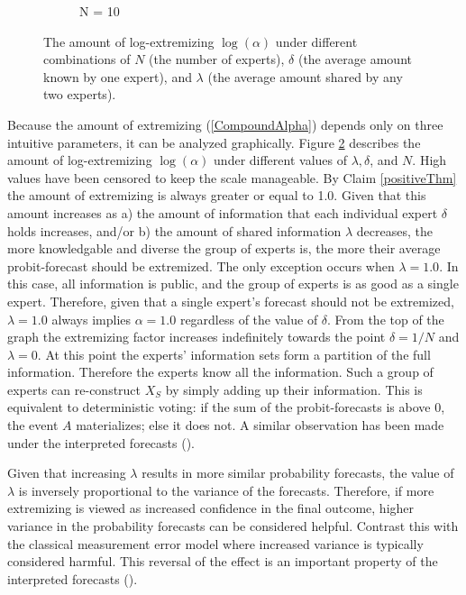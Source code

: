 \documentclass[11pt]{article}
\theoremstyle{definition}
\theoremstyle{definition}
\begin{document}
\begin{figure}[t]
\begin{subfigure}[b]{0.499\textwidth}
\caption{N = 10}
\label{ExtremeN10}
        \end{subfigure}
        \caption{ The amount of log-extremizing $\log(\alpha)$ under different combinations of $N$ (the number of experts), $\delta$ (the average amount known by one expert), and $\lambda$ (the average amount shared by any two experts).}
        \label{Levelplots}
\end{figure}
 

Because the amount of extremizing (\ref{CompoundAlpha}) depends only on three intuitive parameters, it can be analyzed graphically. Figure \ref{Levelplots} describes the amount of log-extremizing $\log(\alpha)$ under different values of $\lambda, \delta$, and $N$. High values have been censored to keep the scale manageable. By Claim \ref{positiveThm} the amount of extremizing is always greater or equal to 1.0. Given that this amount increases as a) the amount of information that each individual expert $\delta$ holds increases, and/or b) the amount of shared information $\lambda$ decreases, the more knowledgable and diverse the group of experts is, the more their average probit-forecast should be extremized. The only exception occurs when $\lambda = 1.0$. In this case, all information is public, and the group of experts is as good as a single expert. Therefore, given that a single expert's forecast should not be extremized, $\lambda = 1.0$ always implies $\alpha = 1.0$ regardless of the value of $\delta$. From the top of the graph the extremizing factor increases indefinitely towards the point $\delta = 1/N$ and $\lambda = 0$. At this point the experts' information sets form a partition of the full information. Therefore the experts know all the information. Such a group of experts can re-construct $X_S$ by simply adding up their  information. This is equivalent to deterministic voting: if the sum of the probit-forecasts is above 0, the event $A$ materializes; else it does not. A similar observation has been made under the interpreted forecasts (\cite{hong2009interpreted}). 

Given that increasing $\lambda$ results in more similar probability forecasts, the value of $\lambda$ is inversely proportional to the variance of the forecasts. Therefore, if more extremizing is viewed as increased confidence in the final outcome, higher variance in the probability forecasts can be considered helpful. Contrast this with the classical measurement error model where increased variance is typically considered harmful. This reversal of the effect is an important property of the interpreted forecasts (\cite{hong2009interpreted}). 
\end{document}
